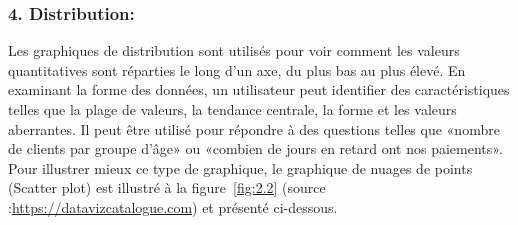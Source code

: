 \documentclass[french, a4paper, 12pt]{report}
\begin{document}
\subsubsection{4. Distribution: }
Les graphiques de distribution sont utilisés pour voir comment les valeurs quantitatives sont réparties le long d'un axe, du plus bas au plus élevé. En examinant la forme des données, un utilisateur peut identifier des caractéristiques telles que la plage de valeurs, la tendance centrale, la forme et les valeurs aberrantes. Il peut être utilisé pour répondre à des questions telles que «nombre de clients par groupe d'âge» ou «combien de jours en retard ont nos paiements».
Pour illustrer mieux ce type de graphique, le graphique de nuages de points (Scatter plot) est illustré à la figure~\ref{fig:2.2} (source :\small \href{https://datavizcatalogue.com/methods/scatterplot.html}{https://datavizcatalogue.com}) et présenté ci-dessous.
\pagebreak
\end{document}
